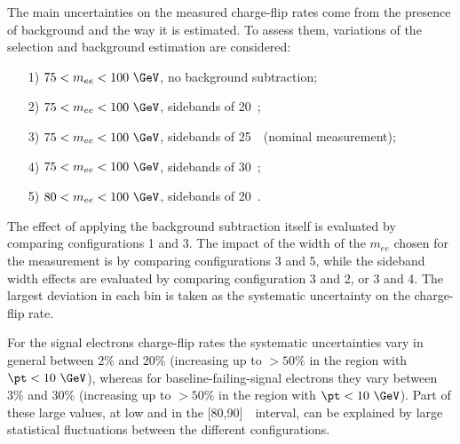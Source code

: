 The main uncertainties on the measured charge-flip rates come from the presence of background and the way it is estimated. To assess them, variations of the selection and background estimation are considered: 
\begin{itemize}
\item[1)] $75<m_{ee}<100~\GeV$, no background subtraction;
\item[2)] $75<m_{ee}<100~\GeV$, sidebands of 20~\GeV;
\item[3)] $75<m_{ee}<100~\GeV$, sidebands of 25~\GeV~(nominal measurement);
\item[4)] $75<m_{ee}<100~\GeV$, sidebands of 30~\GeV;
\item[5)] $80<m_{ee}<100~\GeV$, sidebands of 20~\GeV.
\end{itemize}

The effect of applying the background subtraction itself is evaluated by comparing configurations 1 and 3. 
The impact of the width of the $m_{ee}$ chosen for the measurement is  by comparing configurations 3 and 5, 
while the sideband width effects are evaluated by comparing configuration 3 and 2, or 3 and 4. 
The largest deviation in each bin is taken as the systematic uncertainty on the charge-flip rate.


For the signal electrons charge-flip rates the systematic uncertainties vary in general between 2\% and 20\% (increasing up to $>50\%$ in the region with $\pt < 10~\GeV$), whereas for baseline-failing-signal electrons they vary between 3\% and 30\% (increasing up to $>50\%$ in the region with $\pt < 10~\GeV$). Part of these large values, at low \pt and in the [80,90]~\GeV~\pt interval, can be explained by large statistical fluctuations between the different configurations.
